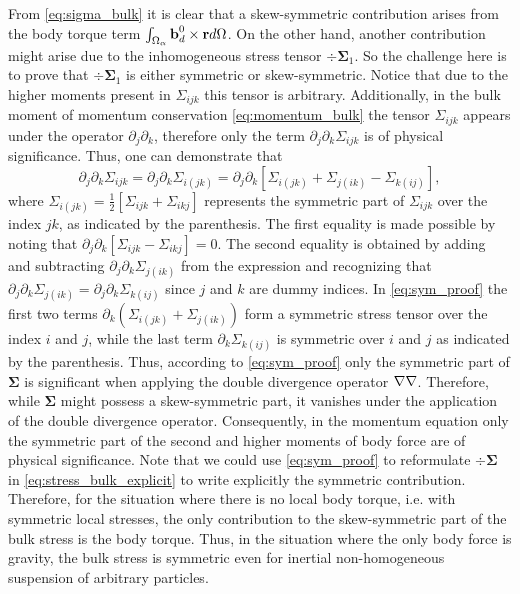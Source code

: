 From \ref{eq:sigma_bulk} it is clear that a skew-symmetric contribution arises from the body torque term $\int_{\Omega_{\alpha}} \textbf{b}_d^0 \times \textbf{r} d\Omega$. 
On the other hand, another contribution might arise due to the inhomogeneous stress tensor $\div \bm\Sigma_1$. 
So the challenge here is to prove that  $\div \bm\Sigma_1$ is either symmetric or skew-symmetric. 
Notice that due to the higher moments present in $\Sigma_{ijk}$ this tensor is arbitrary. 
Additionally, in the bulk moment of momentum conservation \eqref{eq:momentum_bulk} the tensor $\Sigma_{ijk}$ appears under the operator $\partial_j \partial_k$, therefore only the term $\partial_j \partial_k \Sigma_{ijk}$ is of physical significance. 
Thus, one can demonstrate that \citep{lhuillier1996contribution}
\begin{equation}
    \partial_j \partial_k \Sigma_{ijk}
    = \partial_j \partial_k \Sigma_{i(jk)}
    =
    \partial_j \partial_k \left[
        \Sigma_{i(jk)}
        + \Sigma_{j(ik)}
        - \Sigma_{k(ij)}
    \right],
    \label{eq:sym_proof}
\end{equation}
where $\Sigma_{i(jk)} = \frac{1}{2}[\Sigma_{ijk} + \Sigma_{ikj}]$ represents the symmetric part of $\Sigma_{ijk}$ over the index $jk$, as indicated by the parenthesis. 
The first equality is made possible by noting that $\partial_j \partial_k [\Sigma_{ijk} - \Sigma_{ikj}] = 0$.
The second equality is obtained by adding and subtracting $\partial_j \partial_k \Sigma_{j(ik)}$ from the expression and recognizing that $\partial_j \partial_k \Sigma_{j(ik)} = \partial_j \partial_k \Sigma_{k(ij)}$ since $j$ and $k$ are dummy indices. 
In \ref{eq:sym_proof} the first two terms $\partial_k(\Sigma_{i(jk)} + \Sigma_{j(ik)})$ form a symmetric stress tensor over the index $i$ and $j$, while the last term $\partial_k\Sigma_{k(ij)}$ is symmetric over $i$ and $j$ as indicated by the parenthesis. 
Thus, according to \ref{eq:sym_proof} only the symmetric part of $\bm\Sigma$ is significant when applying the double divergence operator $\mathbf{\nabla}\mathbf{\nabla}$. 
Therefore, while $\bm\Sigma$ might possess a skew-symmetric part, it vanishes under the application of the double divergence operator. 
Consequently, in the momentum equation only the symmetric part of the second and higher moments of body force are of physical significance.
Note that we could use \ref{eq:sym_proof} to reformulate $\div\bm\Sigma$ in \ref{eq:stress_bulk_explicit} to write explicitly the symmetric contribution. 
Therefore, for the situation where there is no local body torque, i.e. with symmetric local stresses,  the only contribution to the skew-symmetric part of the bulk stress is the body torque.
Thus, in the situation where the only body force is gravity, the bulk stress is symmetric even for inertial non-homogeneous suspension of arbitrary particles. 

